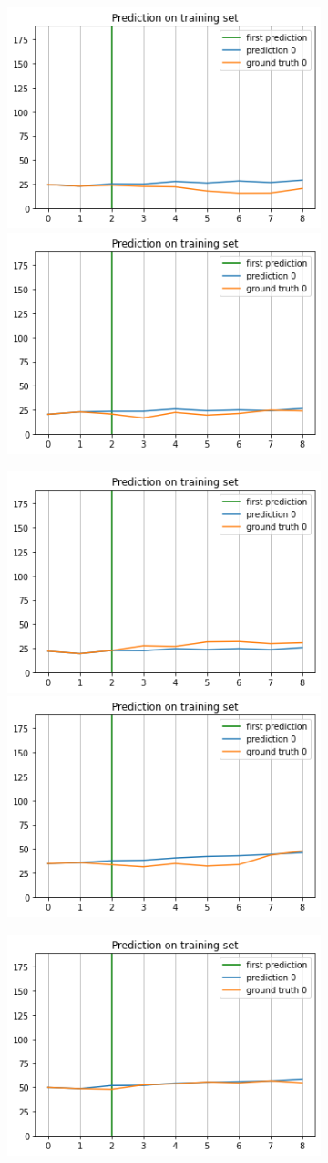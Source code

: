 \documentclass[a4paper]{article}
\begin{document}
  \begin{figure}
    \begin{subfigure}{\linewidth}
      \includegraphics[width=.45\linewidth]{rnn3_train_1.png}\hfill
      \includegraphics[width=.45\linewidth]{rnn3_train_2.png}\hfill
    \end{subfigure}\par\medskip
    \begin{subfigure}{\linewidth}
      \includegraphics[width=.45\linewidth]{rnn3_train_3.png}\hfill
      \includegraphics[width=.45\linewidth]{rnn3_train_4.png}\hfill
    \end{subfigure}\par\medskip
    \begin{subfigure}{\linewidth}
      \begin{center}
        \includegraphics[width=.45\linewidth]{rnn3_train_5.png}

\end{center}
\end{subfigure}
\end{figure}
\end{document}
